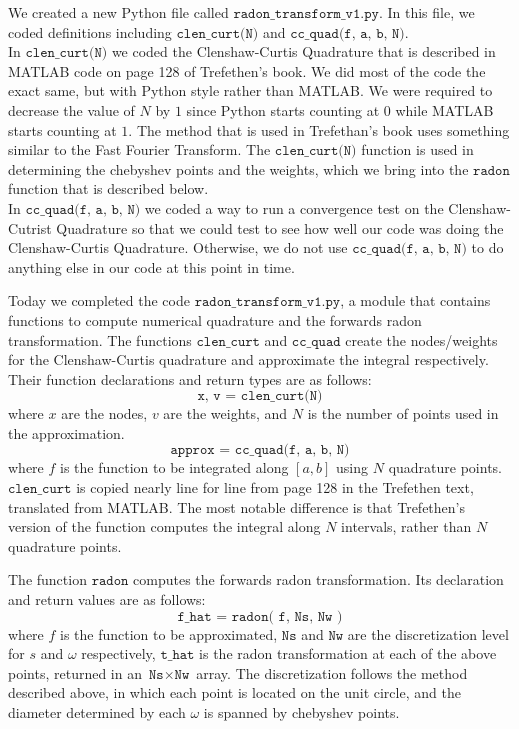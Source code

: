 \documentclass[12pt]{article}
\begin{document}
We created a new Python file called $\texttt{radon\_transform\_v1.py}$. In this file, we coded definitions including $\texttt{clen\_curt(N)}$ and $\texttt{cc\_quad(f, a, b, N)}$. \\

In $\texttt{clen\_curt(N)}$ we coded the Clenshaw-Curtis Quadrature that is described in MATLAB code on page 128 of Trefethen's book. We did most of the code the exact same, but with Python style rather than MATLAB. We were required to decrease the value of $N$ by $1$ since Python starts counting at $0$ while MATLAB starts counting at $1$. The method that is used in Trefethan's book uses something similar to the Fast Fourier Transform. The $\texttt{clen\_curt(N)}$ function is used in determining the chebyshev points and the weights, which we bring into the $\texttt{radon}$ function that is described below. \\

In $\texttt{cc\_quad(f, a, b, N)}$ we coded a way to run a convergence test on the Clenshaw-Cutrist Quadrature so that we could test to see how well our code was doing the Clenshaw-Curtis Quadrature. Otherwise, we do not use $\texttt{cc\_quad(f, a, b, N)}$ to do anything else in our code at this point in time. 

Today we completed the code $\texttt{radon\_transform\_v1.py}$, a module that contains functions to compute numerical quadrature and the forwards radon transformation.
The functions $\texttt{clen\_curt}$ and $\texttt{cc\_quad}$ create the nodes/weights for the Clenshaw-Curtis quadrature and approximate the integral respectively.
Their function declarations and return types are as follows:
$$\texttt{x, v = clen\_curt(N)}$$
where $x$ are the nodes, $v$ are the weights, and $N$ is the number of points used in the approximation.
$$\texttt{approx = cc\_quad(f, a, b, N)}$$
where $f$ is the function to be integrated along $[a, b]$ using $N$ quadrature points.
$\texttt{clen\_curt}$ is copied nearly line for line from page 128 in the Trefethen text, translated from MATLAB.
The most notable difference is that Trefethen's version of the function computes the integral along $N$ intervals, rather than $N$ quadrature points.


The function $\texttt{radon}$ computes the forwards radon transformation.
Its declaration and return values are as follows:
$$\texttt{f\_hat = radon( f, Ns, Nw )}$$
where $f$ is the function to be approximated, $\texttt{Ns}$ and $\texttt{Nw}$ are the discretization level for $s$ and $\omega$ respectively, $\texttt{t\_hat}$ is the radon transformation at each of the above points, returned in an $\texttt{Ns}\times\texttt{Nw}$ array.
The discretization follows the method described above, in which each point is located on the unit circle, and the diameter determined by each $\omega$ is spanned by chebyshev points. 
\end{document}
